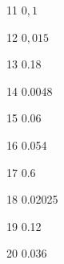 \begin{loigiaibt}{11}
 $0,1$
\end{loigiaibt}
\begin{loigiaibt}{12}
 $0,015$
\end{loigiaibt}
\begin{loigiaibt}{13}
 0.18
\end{loigiaibt}
\begin{loigiaibt}{14}
 0.0048
\end{loigiaibt}
\begin{loigiaibt}{15}
 0.06
\end{loigiaibt}
\begin{loigiaibt}{16}
 0.054
\end{loigiaibt}
\begin{loigiaibt}{17}
 0.6
\end{loigiaibt}
\begin{loigiaibt}{18}
 0.02025
\end{loigiaibt}
\begin{loigiaibt}{19}
 0.12
\end{loigiaibt}
\begin{loigiaibt}{20}
 0.036
\end{loigiaibt}
